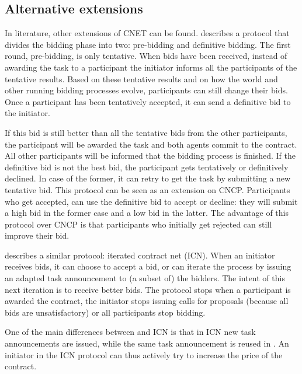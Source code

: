 \documentclass[10pt,a4paper,twocolumn]{article}
\begin{document}
\subsection{Alternative extensions}
In literature, other extensions of CNET can be found. \cite{TentativeBidding} describes a protocol that divides the bidding phase into two: pre-bidding and definitive bidding. The first round, pre-bidding, is only tentative. When bids have been received, instead of awarding the task to a participant the initiator informs all the participants of the tentative results. Based on these tentative results and on how the world and other running bidding processes evolve, participants can still change their bids. Once a participant has been tentatively accepted, it can send a definitive bid to the initiator.

If this bid is still better than all the tentative bids from the other participants, the participant will be awarded the task and both agents commit to the contract. All other participants will be informed that the bidding process is finished. If the definitive bid is not the best bid, the participant gets tentatively or definitively declined. In case of the former, it can retry to get the task by submitting a new tentative bid. This protocol can be seen as an extension on CNCP. Participants who get accepted, can use the definitive bid to accept or decline: they will submit a high bid in the former case and a low bid in the latter. The advantage of this protocol over CNCP is that participants who initially get rejected can still improve their bid.

\cite{CNETIterativeStandard} describes a similar protocol: iterated contract net (ICN). When an initiator receives bids, it can choose to accept a bid, or can iterate the process by issuing an adapted task announcement to (a subset of) the bidders. The intent of this next iteration is to receive better bids. The protocol stops when a participant is awarded the contract, the initiator stops issuing calls for proposals (because all bids are unsatisfactory) or all participants stop bidding.

One of the main differences between \cite{TentativeBidding} and ICN is that in ICN new task announcements are issued, while the same task announcement is reused in \cite{TentativeBidding}. An initiator in the ICN protocol can thus actively try to increase the price of the contract.  
\end{document}
